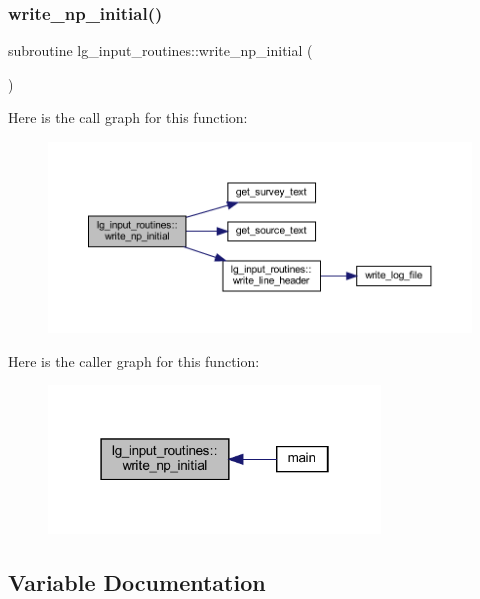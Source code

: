\subsubsection{\texorpdfstring{write\+\_\+np\+\_\+initial()}{write\_np\_initial()}}
{\footnotesize\ttfamily subroutine lg\+\_\+input\+\_\+routines\+::write\+\_\+np\+\_\+initial (\begin{DoxyParamCaption}{ }\end{DoxyParamCaption})}

Here is the call graph for this function\+:\nopagebreak
\begin{figure}[H]
\begin{center}
\leavevmode
\includegraphics[width=350pt]{namespacelg__input__routines_a1e34012960c952d22446828d97881001_cgraph}
\end{center}
\end{figure}
Here is the caller graph for this function\+:\nopagebreak
\begin{figure}[H]
\begin{center}
\leavevmode
\includegraphics[width=250pt]{namespacelg__input__routines_a1e34012960c952d22446828d97881001_icgraph}
\end{center}
\end{figure}


\subsection{Variable Documentation}
\mbox{\label{namespacelg__input__routines_ad240d679ecd403cc52aac764201bfc5b}} 
